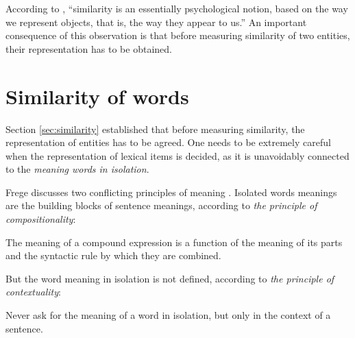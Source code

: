 According to , ``similarity is an essentially psychological notion, based on the way we represent objects, that is, the way they appear to us.'' An important consequence of this observation is that before measuring similarity of two
entities,\footnotemark{} their representation has to be obtained.




\section{Similarity of words}
\label{sec:word-meaning}

Section \ref{sec:similarity} established that before measuring similarity, the representation of entities has to be agreed. One needs to be extremely careful when the representation of lexical items is decided, as it is unavoidably connected to the \emph{meaning words in isolation}.


Frege discusses two conflicting principles of meaning \cite{Janssen2001}. Isolated words meanings are the building blocks of sentence meanings, according to \emph{the principle of compositionality}:
\begin{displayquote}
The meaning of a compound expression is a function of the meaning of its parts and the syntactic rule by which they are combined.
\end{displayquote}
But the word meaning in isolation is not defined, according to \emph{the principle of contextuality}:
\begin{displayquote}
Never ask for the meaning of a word in isolation, but only in the context of a sentence.
\end{displayquote}

